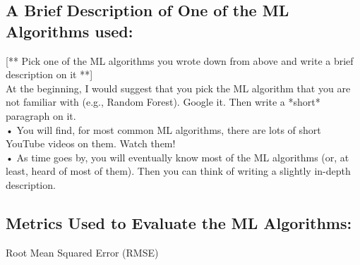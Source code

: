 \documentclass[]{article}
\begin{document}
\subsection*{A Brief Description of One of the ML Algorithms used:}
[** Pick one of the ML algorithms you wrote down from above and write a brief description on it **] \\
At the beginning, I would suggest that you pick the ML algorithm that you are not familiar with (e.g., Random Forest). Google it. Then write a *short* paragraph on it. \\
• You will find, for most common ML algorithms, there are lots of short YouTube videos on them. Watch them! \\
• As time goes by, you will eventually know most of the ML algorithms (or, at least, heard of most of them). Then you can think of writing a slightly in-depth description. 

\subsection*{Metrics Used to Evaluate the ML Algorithms:}
Root Mean Squared Error (RMSE)
\end{document}
